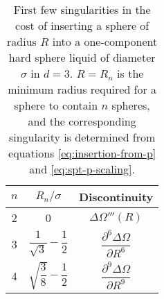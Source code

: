 \documentclass[11pt,twoside]{report}
\def\includebibliography{}
\begin{document}
\begin{SCtable}
  \begin{minipage}[b]{\linewidth}
    \centering
    \begin{tabular}{ccc}
      \toprule
      $n$ & $R_n / \sigma$ & Discontinuity \\
      \midrule
      2 & 0 & $\Delta \Omega'''(R)$
      \\
      3 & $\dfrac{1}{\sqrt{3}} - \dfrac{1}{2}$ &
      $\dfrac{\partial^6 \Delta \Omega}{\partial R^6}$
      \vspace{0.25em} \\
      4 & $\sqrt{\dfrac{3}{8}} - \dfrac{1}{2}$ &
      $\dfrac{\partial^9 \Delta \Omega}{\partial R^9}$ \\
      \bottomrule
    \end{tabular}
  \end{minipage}
  \caption[First few singularities in the insertion cost]{
    First few singularities in the cost of inserting a sphere of radius $R$ into a one-component hard sphere liquid of diameter $\sigma$ in $d=3$.
    $R = R_n$ is the minimum radius required for a sphere to contain $n$ spheres, and the corresponding singularity is determined from equations \eqref{eq:insertion-from-p} and \eqref{eq:spt-p-scaling}.}
  \label{table:spt-singularities}
\end{SCtable}

\ifdefined\includebibliography
  \printbibliography
\fi
\end{document}
